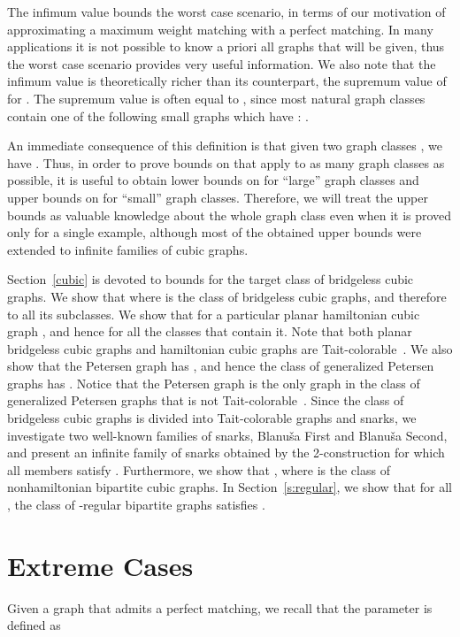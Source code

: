\documentclass{article}
\begin{document}
The infimum value bounds the worst case scenario, in terms of our motivation of approximating a maximum weight matching with a perfect matching. In many applications it is not possible to know a priori all graphs that will be given, thus the worst case scenario provides very useful information.  We also note that the infimum value is theoretically richer than its counterpart, the supremum value of  for . The supremum value is often equal to , since most natural graph classes contain one of the following small graphs which have : .

An immediate consequence of this definition is that given two graph classes , we have . 
Thus, in order to prove bounds on  that apply to as many graph classes as possible, it is useful to obtain lower bounds on  for ``large'' graph classes and upper bounds on  for ``small'' graph classes. 
Therefore, we will treat the upper bounds as valuable knowledge about the whole graph class even when it is proved only for a single example, although most of the obtained upper bounds were extended to infinite families of cubic graphs.

Section~\ref{cubic} is devoted to bounds for the target class of bridgeless
cubic graphs. We show that  where  is the class of bridgeless cubic graphs, and therefore to all its subclasses.
We show that  for a particular planar hamiltonian cubic graph , and hence for all the classes that contain it. 
Note that both planar  bridgeless cubic graphs and hamiltonian cubic graphs are Tait-colorable~\cite{bm}. 
We also show that the Petersen graph has , and hence the class of generalized Petersen graphs has . Notice that the Petersen graph is the only graph in the class of generalized Petersen graphs that is not Tait-colorable~\cite{Castagna1972}. Since the class of bridgeless cubic graphs is divided into Tait-colorable graphs and snarks, we investigate two well-known families of snarks, Blanu\v{s}a First and Blanu\v{s}a Second, and present an infinite family of snarks obtained by the 2-construction for which all members satisfy . Furthermore, we show that , where  is the class of nonhamiltonian bipartite cubic graphs.
In Section~\ref{s:regular}, we show that for all , the class  of -regular bipartite graphs satisfies . 

\section{Extreme Cases}
\label{extreme}

Given a graph  that admits a perfect matching, we recall that the parameter  is defined as
\end{document}
